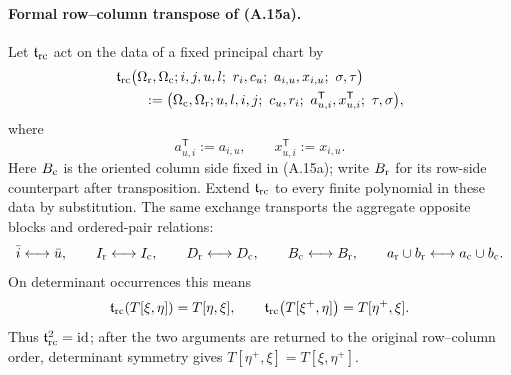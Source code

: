 \documentclass[11pt]{article}
\begin{document}
\paragraph{Formal row--column transpose of (A.15a).}
Let $\mathfrak t_{\rm rc}$ act on the data of a fixed principal chart by
\[
\begin{aligned}
&\mathfrak t_{\rm rc}\bigl(
 \Omega_{\rm r},\Omega_{\rm c};
 i,j,u,l;\ r_i,c_u;\ a_{i,u},x_{i,u};\ \sigma,\tau
 \bigr)\\
&\qquad:=
 \bigl(
 \Omega_{\rm c},\Omega_{\rm r};
 u,l,i,j;\ c_u,r_i;\ a^{\mathsf T}_{u,i},x^{\mathsf T}_{u,i};\
 \tau,\sigma
 \bigr),
\end{aligned}
\]
where
\[
 a^{\mathsf T}_{u,i}:=a_{i,u},
 \qquad
 x^{\mathsf T}_{u,i}:=x_{i,u}.
\]
Here $B_{\rm c}$ is the oriented column side fixed in (A.15a); write
$B_{\rm r}$ for its row-side counterpart after transposition.
Extend $\mathfrak t_{\rm rc}$ to every finite polynomial in these data by
substitution.  The same exchange transports the aggregate opposite blocks
and ordered-pair relations:
\[
 \bar i\longleftrightarrow\bar u,\qquad
 I_{\rm r}\longleftrightarrow I_{\rm c},\qquad
 D_{\rm r}\longleftrightarrow D_{\rm c},\qquad
 B_{\rm c}\longleftrightarrow B_{\rm r},\qquad
 a_{\rm r}\cup b_{\rm r}\longleftrightarrow
 a_{\rm c}\cup b_{\rm c}.
\]
On determinant occurrences this means
\[
 \mathfrak t_{\rm rc}\!\left(T[\xi,\eta]\right)=T[\eta,\xi],
 \qquad
 \mathfrak t_{\rm rc}\!\left(T[\xi^+,\eta]\right)=T[\eta^+,\xi].
\]
Thus $\mathfrak t_{\rm rc}^2=\mathrm{id}$; after the two arguments are
returned to the original row--column order, determinant symmetry gives
$T[\eta^+,\xi]=T[\xi,\eta^+]$.
\end{document}
